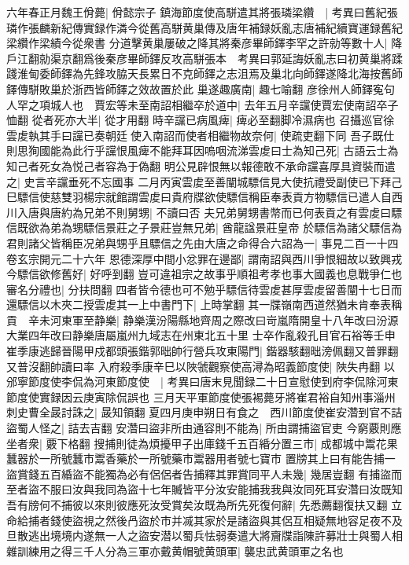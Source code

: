 六年春正月魏王佾薨|{
	佾懿宗子}
鎮海節度使高駢遣其將張璘梁纘　|{
	考異曰舊紀張璘作張麟新紀傳實録作潾今從舊高駢黄巢傳及唐年補録妖亂志唐補紀續寶運録舊紀梁纘作梁績今從衆書}
分道擊黄巢屢破之降其將秦彦畢師鐸李罕之許勍等數十人|{
	降戶江翻勍渠京翻爲後秦彦畢師鐸反攻高駢張本　考異曰郭延誨妖亂志曰初黄巢將蹂踐淮甸委師鐸為先鋒攻脇天長累日不克師鐸之志沮焉及巢北向師鐸遂降北海按舊師鐸傳駢敗巢於浙西皆師鐸之效故置於此}
巢遂趣廣南|{
	趣七喻翻}
彦徐州人師鐸寃句人罕之項城人也　賈宏等未至南詔相繼卒於道中|{
	去年五月辛讜使賈宏使南詔卒子恤翻}
從者死亦大半|{
	從才用翻}
時辛讜已病風痺|{
	痺必至翻脚冷濕病也}
召攝巡官徐雲䖍執其手曰讜已奏朝廷使入南詔而使者相繼物故奈何|{
	使疏吏翻下同}
吾子既仕則思狥國能為此行乎讜恨風痺不能拜耳因嗚咽流涕雲䖍曰士為知己死|{
	古語云士為知己者死女為悦己者容為于偽翻}
明公見辟恨無以報德敢不承命讜喜厚具資裝而遣之|{
	史言辛讜垂死不忘國事}
二月丙寅雲䖍至善闡城驃信見大使抗禮受副使已下拜己巳驃信使慈雙羽楊宗就館謂雲䖍曰貴府牒欲使驃信稱臣奉表貢方物驃信已遣人自西川入唐與唐約為兄弟不則舅甥|{
	不讀曰否}
夫兄弟舅甥書幣而已何表貢之有雲䖍曰驃信既欲為弟為甥驃信景莊之子景莊豈無兄弟|{
	酋龍諡景莊皇帝}
於驃信為諸父驃信為君則諸父皆稱臣况弟與甥乎且驃信之先由大唐之命得合六詔為一|{
	事見二百一十四卷玄宗開元二十六年}
恩德深厚中間小忿罪在邊鄙|{
	謂南詔與西川爭恨細故以致興戎}
今驃信欲修舊好|{
	好呼到翻}
豈可違祖宗之故事乎順祖考孝也事大國義也息戰爭仁也審名分禮也|{
	分扶問翻}
四者皆令德也可不勉乎驃信待雲䖍甚厚雲䖍留善闡十七日而還驃信以木夾二授雲䖍其一上中書門下|{
	上時掌翻}
其一牒嶺南西道然猶未肯奉表稱貢　辛未河東軍至静樂|{
	静樂漢汾陽縣地齊周之際改曰岢嵐隋開皇十八年改曰汾源大業四年改曰静樂唐屬嵐州九域志在州東北五十里}
士卒作亂殺孔目官石裕等壬申崔季康逃歸晉陽甲戍都頭張鍇郭昢帥行營兵攻東陽門|{
	鍇器駭翻昢滂佩翻又普罪翻又普沒翻帥讀曰率}
入府殺季康辛巳以陜虢觀察使高潯為昭義節度使|{
	陜失冉翻}
以邠寧節度使李侃為河東節度使　|{
	考異曰唐末見聞録二十日宣慰使到府李侃除河東節度使實録因云庚寅除侃誤也}
三月天平軍節度使張裼薨牙將崔君裕自知州事淄州刺史曹全晸討誅之|{
	晸知領翻}
夏四月庚申朔日有食之　西川節度使崔安濳到官不詰盜蜀人怪之|{
	詰去吉翻}
安濳曰盜非所由通容則不能為|{
	所由謂捕盜官吏}
今窮覈則應坐者衆|{
	覈下格翻}
搜捕則徒為煩擾甲子出庫錢千五百緍分置三市|{
	成都城中鬻花果蠶器於一所號蠶市鬻香藥於一所號藥市鬻器用者號七寶市}
置牓其上曰有能告捕一盜賞錢五百緍盜不能獨為必有侶侶者告捕釋其罪賞同平人未幾|{
	幾居豈翻}
有捕盜而至者盜不服曰汝與我同為盜十七年贓皆平分汝安能捕我我與汝同死耳安濳曰汝既知吾有牓何不捕彼以來則彼應死汝受賞矣汝既為所先死復何辭|{
	先悉薦翻復扶又翻}
立命給捕者錢使盜視之然後冎盜於市并㓕其家於是諸盜與其侶互相疑無地容足夜不及旦散逃出境境内遂無一人之盜安潜以蜀兵怯弱奏遣大將齎牒詣陳許募壯士與蜀人相雜訓練用之得三千人分為三軍亦戴黄帽號黄頭軍|{
	襲忠武黄頭軍之名也}
